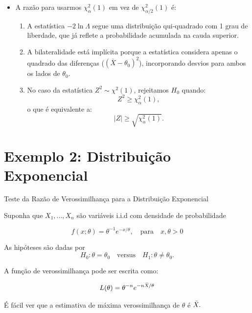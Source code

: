 \documentclass[12pt]{beamer}
\begin{document}
\begin{frame}{}
	\begin{block}{}

		\begin{itemize}		
			\justifying
			\item A razão para usarmos \(\chi^2_\alpha(1)\) em vez de \(\chi^2_{\alpha/2}(1)\) é:
			\begin{enumerate}
				\justifying
				\item A estatística \(-2 \ln \Lambda\) segue uma distribuição qui-quadrado com 1 grau de liberdade, que já reflete a probabilidade acumulada na cauda superior.\pause
				\item A bilateralidade está implícita porque a estatística considera apenas o quadrado das diferenças (\((\bar{X} - \theta_0)^2\)), incorporando desvios para ambos os lados de \(\theta_0\).\pause
				\item No caso da estatística \(Z^2 \sim \chi^2(1)\), rejeitamos \(H_0\) quando:
				\[
				Z^2 \geq \chi^2_\alpha(1),
				\]
				o que é equivalente a:
				\[
				|Z| \geq \sqrt{\chi^2_\alpha(1)}.
				\]
			\end{enumerate}
		\end{itemize}
	\end{block}
\end{frame}



\section{Exemplo 2: Distribuição Exponencial}
\begin{frame}{Teste da Razão de Verossimilhança para a Distribuição Exponencial}
\begin{block}{}
\justifying
Suponha que $X_1, \ldots, X_n$ são variáveis i.i.d com densidade de probabilidade

\[
f(x; \theta) = \theta^{-1} e^{-x/\theta}, \quad \text{para} \quad x, \theta > 0
\]

As hipóteses são dadas por 
\[
H_0: \theta = \theta_0 \quad \text{versus} \quad H_1: \theta \neq \theta_0.
\]

A função de verossimilhança pode ser escrita como:

\[
L(\theta) = \theta^{-n} e^{-n\Bar{X}/\theta}
\]

É fácil ver que a estimativa de máxima verossimilhança de $\theta$ é $\Bar{X}.$
\end{block}
\end{frame}
\end{document}
